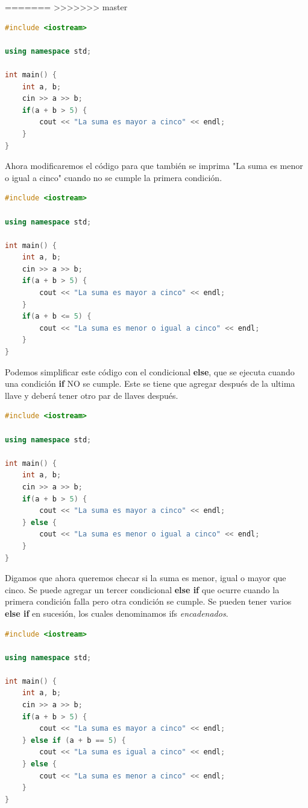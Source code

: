 \documentclass{article}
\begin{document}
=======
>>>>>>> master
\begin{lstlisting}[language=C++, title=Condiciones]
#include <iostream>

using namespace std;

int main() {
	int a, b;
	cin >> a >> b;
	if(a + b > 5) {
		cout << "La suma es mayor a cinco" << endl;
	}
}
\end{lstlisting}

Ahora modificaremos el código para que también se imprima "La suma es menor o igual a cinco" cuando no se cumple la primera condición.

\begin{lstlisting}[language=C++, title=Condiciones]
#include <iostream>

using namespace std;

int main() {
	int a, b;
	cin >> a >> b;
	if(a + b > 5) {
		cout << "La suma es mayor a cinco" << endl;
	}
	if(a + b <= 5) {
		cout << "La suma es menor o igual a cinco" << endl;
	}
}
\end{lstlisting}

Podemos simplificar este código con el condicional \textbf{else}, que se ejecuta cuando una condición \textbf{if} NO se cumple. Este se tiene que agregar después de la ultima llave y deberá tener otro par de llaves después.

\begin{lstlisting}[language=C++, title=Else]
#include <iostream>

using namespace std;

int main() {
	int a, b;
	cin >> a >> b;
	if(a + b > 5) {
		cout << "La suma es mayor a cinco" << endl;
	} else {
		cout << "La suma es menor o igual a cinco" << endl;
	}
}
\end{lstlisting}

Digamos que ahora queremos checar si la suma es menor, igual o mayor que cinco. Se puede agregar un tercer condicional \textbf{else if} que ocurre cuando la primera condición falla pero otra condición se cumple. Se pueden tener varios \textbf{else if} en sucesión, los cuales denominamos ifs \textit{encadenados}.

\begin{lstlisting}[language=C++, title=Else if]
#include <iostream>

using namespace std;

int main() {
	int a, b;
	cin >> a >> b;
	if(a + b > 5) {
		cout << "La suma es mayor a cinco" << endl;
	} else if (a + b == 5) {
		cout << "La suma es igual a cinco" << endl;
	} else {
		cout << "La suma es menor a cinco" << endl;
	}
}
\end{lstlisting}
\end{document}
